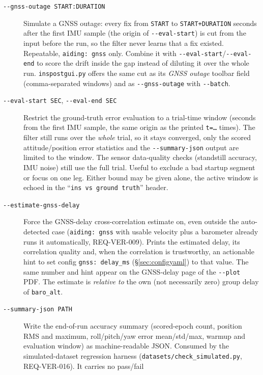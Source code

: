 \documentclass[11pt,a4paper]{article}
\newcommand{\code}[1]{\texttt{#1}}
\begin{document}
\begin{description}
  \item[\code{-{}-gnss-outage START:DURATION}] Simulate a GNSS outage:
    every fix from \code{START} to \code{START+DURATION} seconds after the
    first IMU sample (the origin of \code{-{}-eval-start}) is cut from the
    input before the run, so the filter never learns that a fix existed.
    Repeatable, \code{aiding: gnss} only. Combine it with
    \code{-{}-eval-start}/\code{-{}-eval-end} to score the drift inside the
    gap instead of diluting it over the whole run. \code{inspostgui.py}
    offers the same cut as its \emph{GNSS outage} toolbar field
    (comma-separated windows) and as \code{-{}-gnss-outage} with
    \code{-{}-batch}.
  \item[\code{-{}-eval-start SEC}, \code{-{}-eval-end SEC}] Restrict the
    ground-truth error evaluation to a trial-time window (seconds from the first
    IMU sample, the same origin as the printed \code{t=\ldots} times). The
    filter still runs over the \emph{whole} trial, so it stays converged,
    only the scored attitude/position error statistics and the
    \code{-{}-summary-json} output are limited to the window. The sensor
    data-quality checks (standstill accuracy, IMU noise) still use the full
    trial. Useful to exclude a bad startup segment or focus on one leg. Either
    bound may be given alone, the active window is echoed in the
    ``\code{ins vs ground truth}'' header.
  \item[\code{-{}-estimate-gnss-delay}] Force the GNSS-delay cross-correlation
    estimate on, even outside the auto-detected case (\code{aiding: gnss} with
    usable velocity plus a barometer already runs it automatically, REQ-VER-009).
    Prints the estimated delay, its correlation quality and, when the
    correlation is trustworthy, an actionable hint to set config
    \code{gnss: delay\_\allowbreak{}ms} (\S\ref{sec:configyaml}) to that value. The same
    number and hint appear on the GNSS-delay page of the \code{-{}-plot} PDF.
    The estimate is \emph{relative to} the own (not necessarily
    zero) group delay of \code{baro\_\allowbreak{}alt}.
  \item[\code{-{}-summary-json PATH}] Write the end-of-run accuracy summary
    (scored-epoch count, position RMS and maximum, roll/pitch/yaw error
    mean/std/max, warmup and evaluation window) as machine-readable JSON.
    Consumed by the simulated-dataset regression harness
    (\code{datasets/check\_\allowbreak{}simulated.py}, REQ-VER-016). It carries no pass/fail

\end{description}
\end{document}
